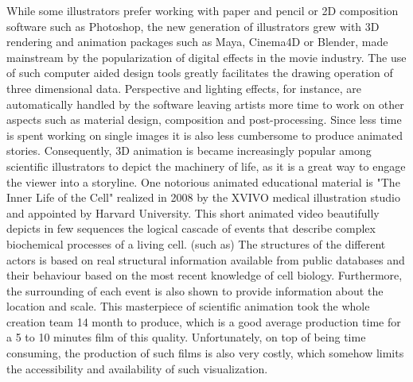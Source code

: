 While some illustrators prefer working with paper and pencil or 2D composition software such as Photoshop, the new generation of illustrators grew with 3D rendering and animation packages such as Maya, Cinema4D or Blender, made mainstream by the popularization of digital effects in the movie industry.
The use of such computer aided design tools greatly facilitates the drawing operation of three dimensional data.
Perspective and lighting effects, for instance, are automatically handled by the software leaving artists more time to work on other aspects such as material design, composition and post-processing.
Since less time is spent working on single images it is also less cumbersome to produce animated stories.
Consequently, 3D animation is became increasingly popular among scientific illustrators to depict the machinery of life, as it is a great way to engage the viewer into a storyline.
One notorious animated educational material is "The Inner Life of the Cell" realized in 2008 by the XVIVO medical illustration studio and appointed by Harvard University.
This short animated video beautifully depicts in few sequences the logical cascade of events that describe complex biochemical processes of a living cell. (such as)
The structures of the different actors is based on real structural information available from public databases and their behaviour based on the most recent knowledge of cell biology.
Furthermore, the surrounding of each event is also shown to provide information about the location and scale.
This masterpiece of scientific animation took the whole creation team 14 month to produce, which is a good average production time for a 5 to 10 minutes film of this quality.
Unfortunately, on top of being time consuming, the production of such films is also very costly, which somehow limits the accessibility and availability of such visualization.

%
%
%



